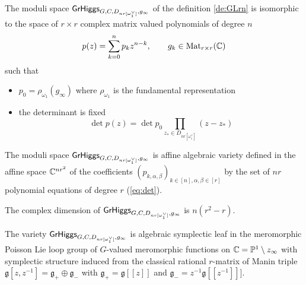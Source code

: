 \documentclass[12pt,psamsfonts,reqno]{amsart}
\begin{document}
\begin{proposition}
  The moduli space $\mathsf{GrHiggs}_{G,C,D_{nr[\omega_1^{\vee}]},g_\infty}$ of the definition \ref{de:GLrn} is isomorphic to the space
  of $r \times r$ complex matrix valued polynomials of degree $n$
  \begin{equation}
    p(z) =  \sum_{k=0}^{n} p_{k} z^{n-k} ,\qquad g_k \in \mathrm{Mat}_{r \times r}(\mathbb C)
  \end{equation}
  such that
  \begin{itemize}
  \item $p_{0}  = \rho_{\omega_1} (g_{\infty})$ where $\rho_{\omega_1}$ is the    fundamental representation 
  \item the determinant is fixed
    \begin{equation}
\label{eq:det}
      \det p(z)  = \det p_0  \prod_{z_{*} \in D_{nr[\omega_1^{\vee}]}} (z - z_{*})
    \end{equation}
  \end{itemize}
\end{proposition}

\begin{proposition}
  The moduli space $\mathsf{GrHiggs}_{G,C,D_{nr[\omega_1^{\vee}]},g_\infty}$ is affine algebraic variety defined in the affine space $\mathbb C^{n r^2}$ of the 
coefficients $(p_{k,\alpha,\beta})_{k \in [n], \alpha, \beta \in [r]}$
by the set of $nr$ polynomial equations of degree $r$ (\ref{eq:det}).


\end{proposition}

\begin{proposition}
The complex dimension of $\mathsf{GrHiggs}_{G,C,D_{nr[\omega_1^{\vee}]},g_\infty}$ is $ n (r^2 - r)$.
\end{proposition}

\begin{proposition}
  The variety $\mathsf{GrHiggs}_{G,C,D_{nr[\omega_1^{\vee}]},g_\infty}$ is algebraic symplectic leaf in the meromorphic Poisson Lie loop
  group of $G$-valued meromorphic functions on $\mathbb C = \mathbb P^1 \setminus z_{\infty}$ with symplectic structure induced from 
 the classical rational $r$-matrix of Manin triple $\mathfrak{g}[z, z^{-1}] = \mathfrak{g}_{+} \oplus \mathfrak{g}_{-}$  with $\mathfrak{g}_{+} = \mathfrak{g}[[z]]$ and $\mathfrak{g}_{-} = z^{-1} \mathfrak{g}[[z^{-1}]]]$. 
\end{proposition}
\end{document}
